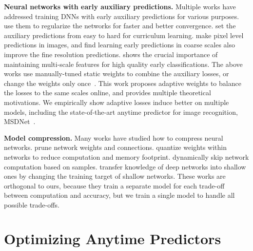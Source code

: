 \textbf{Neural networks with early auxiliary predictions.} 
Multiple works have addressed training DNNs with early auxiliary predictions for various purposes. \cite{supervisednet,inception_v4,pspnet,fractalnet} use them to regularize the networks for faster and better convergence. \cite{curriculum,feedbacknet} set the auxiliary predictions from easy to hard for curriculum learning. \cite{hed,reverse_scene_seg} make pixel level predictions in images, and find learning early predictions in coarse scales also improve the fine resolution predictions. \cite{msdense} shows the crucial importance of maintaining multi-scale features for high quality early classifications. The above works use manually-tuned static weights to combine the auxiliary losses, or change the weights only once~\cite{reverse_scene_seg}. This work proposes adaptive weights to balance the losses to the same scales online, and provides multiple theoretical motivations. We empirically show adaptive losses induce better \anns on multiple models, including the state-of-the-art anytime predictor for image recognition, MSDNet~\cite{msdense}. %

\textbf{Model compression.} 
Many  works have studied how to compress neural networks.  \cite{prune_nn,slim_nn} prune network weights and connections. \cite{binary_nn,binary_nn_eccv,squeezenet} quantize weights within networks to reduce computation and memory footprint. 
\cite{wang2017skipnet,veit2017convolutional} dynamically skip network computation based on samples.
\cite{deepreally,distillation} transfer knowledge of deep networks into shallow ones by changing the training target of shallow networks. 
These works are orthogonal to ours, because they train a separate model for each trade-off between computation and accuracy, but we train a single model to handle all possible trade-offs.




\section{Optimizing Anytime Predictors}

\label{sec:ann}

